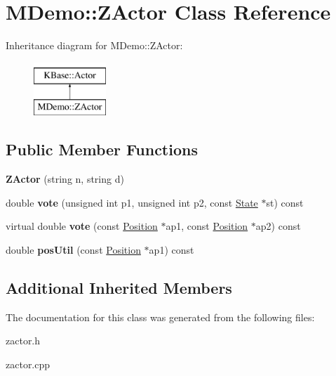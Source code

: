 \hypertarget{class_m_demo_1_1_z_actor}{\section{M\-Demo\-:\-:Z\-Actor Class Reference}
\label{class_m_demo_1_1_z_actor}
}
Inheritance diagram for M\-Demo\-:\-:Z\-Actor\-:\begin{figure}[H]
\begin{center}
\leavevmode
\includegraphics[height=2.000000cm]{class_m_demo_1_1_z_actor}
\end{center}
\end{figure}
\subsection*{Public Member Functions}
\begin{DoxyCompactItemize}
\item 
\hypertarget{class_m_demo_1_1_z_actor_add67a9fe96f4602aa06ccaa68c0f4fc7}{{\bfseries Z\-Actor} (string n, string d)}\label{class_m_demo_1_1_z_actor_add67a9fe96f4602aa06ccaa68c0f4fc7}

\item 
\hypertarget{class_m_demo_1_1_z_actor_ab43b2574f0c915a6752cf35342773163}{double {\bfseries vote} (unsigned int p1, unsigned int p2, const \hyperlink{class_k_base_1_1_state}{State} $\ast$st) const }\label{class_m_demo_1_1_z_actor_ab43b2574f0c915a6752cf35342773163}

\item 
\hypertarget{class_m_demo_1_1_z_actor_a8353eb51f6d09b6111fafa2e8299fa3e}{virtual double {\bfseries vote} (const \hyperlink{class_k_base_1_1_position}{Position} $\ast$ap1, const \hyperlink{class_k_base_1_1_position}{Position} $\ast$ap2) const }\label{class_m_demo_1_1_z_actor_a8353eb51f6d09b6111fafa2e8299fa3e}

\item 
\hypertarget{class_m_demo_1_1_z_actor_a6bd5b6fa4defc8cda93be2c31e40dec9}{double {\bfseries pos\-Util} (const \hyperlink{class_k_base_1_1_position}{Position} $\ast$ap1) const }\label{class_m_demo_1_1_z_actor_a6bd5b6fa4defc8cda93be2c31e40dec9}

\end{DoxyCompactItemize}
\subsection*{Additional Inherited Members}


The documentation for this class was generated from the following files\-:\begin{DoxyCompactItemize}
\item 
zactor.\-h\item 
zactor.\-cpp\end{DoxyCompactItemize}
